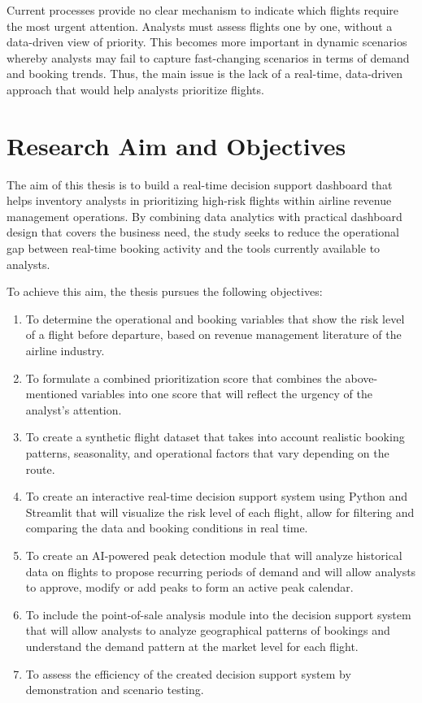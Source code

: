 Current processes provide no clear mechanism to indicate which flights require the most urgent attention. Analysts must assess flights one by one, without a data-driven view of priority. This becomes more important in dynamic scenarios whereby analysts may fail to capture fast-changing scenarios in terms of demand and booking trends. Thus, the main issue is the lack of a real-time, data-driven approach that would help analysts prioritize flights.

\section{Research Aim and Objectives}
\label{sec:aim}

The aim of this thesis is to build a real-time decision support dashboard that helps inventory analysts in prioritizing high-risk flights within airline revenue management operations. By combining data analytics with practical dashboard design that covers the business need, the study seeks to reduce the operational gap between real-time booking activity and the tools currently available to analysts.

To achieve this aim, the thesis pursues the following objectives:

\begin{enumerate}
    \item To determine the operational and booking variables that show the risk level of a flight before departure, based on revenue management literature of the airline industry.
    \item To formulate a combined prioritization score that combines the above-mentioned variables into one score that will reflect the urgency of the analyst's attention.
    \item To create a synthetic flight dataset that takes into account realistic booking patterns, seasonality, and operational factors that vary depending on the route.
    \item To create an interactive real-time decision support system using Python and Streamlit that will visualize the risk level of each flight, allow for filtering and comparing the data and booking conditions in real time.
    \item To create an AI-powered peak detection module that will analyze historical data on flights to propose recurring periods of demand and will allow analysts to approve, modify or add peaks to form an active peak calendar.
    \item To include the point-of-sale analysis module into the decision support system that will allow analysts to analyze geographical patterns of bookings and understand the demand pattern at the market level for each flight.
    \item To assess the efficiency of the created decision support system by demonstration and scenario testing.
\end{enumerate}


